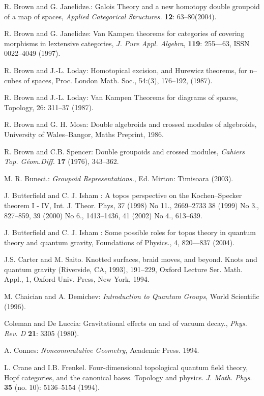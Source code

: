 \documentclass[12pt]{article}
\theoremstyle{plain}
\theoremstyle{definition}
\numberwithin{equation}{section}
\newcommand{\<}{{\langle}}
\begin{document}
\begin{thebibliography}{99}
R. Brown and G. Janelidze.: Galois Theory and a new homotopy double groupoid of a map of spaces, {\em Applied Categorical Structures.} \textbf{12}: 63--80(2004).

R. Brown and G. Janelidze: Van Kampen theorems for categories of covering morphisms in lextensive categories, \textit{J. Pure Appl. Algebra}, \textbf{119}: 255---63, ISSN 0022--4049 (1997).

R. Brown and J.-L. Loday: Homotopical excision, and Hurewicz theorems, for n--cubes of spaces, Proc. London Math. Soc., 54:(3), 176--192, (1987).

R. Brown and J.-L. Loday: Van Kampen Theorems for diagrams of spaces, Topology, 26: 311--37 (1987).

R. Brown and G. H. Mosa: Double algebroids and crossed modules of algebroids, University of Wales--Bangor, Maths Preprint, 1986.

R. Brown  and C.B. Spencer: Double groupoids and crossed modules,
\emph{Cahiers Top. G\'eom.Diff.} \textbf{17} (1976), 343--362.

M. R. Buneci.: \emph{Groupoid Representations.}, Ed. Mirton: Timisoara (2003).

J. Butterfield and C. J. Isham : A topos perspective on the Kochen--Specker theorem I - IV, Int. J. Theor. Phys, 37 (1998) No 11., 2669--2733 38 (1999) No 3., 827--859, 39 (2000) No 6., 1413--1436, 41 (2002) No 4., 613--639.

J. Butterfield and C. J. Isham : Some possible roles for topos theory in quantum theory and quantum gravity, Foundations of Physics., 4, 820---837 (2004).

J.S. Carter and M. Saito. Knotted surfaces, braid moves, and beyond. Knots and
quantum gravity (Riverside, CA, 1993), 191--229, Oxford Lecture Ser. Math. Appl.,
1, Oxford Univ. Press, New York, 1994.

M. Chaician and A. Demichev: \emph{Introduction to Quantum Groups}, World Scientific (1996).

Coleman and De Luccia: Gravitational effects on and of vacuum decay., \emph{Phys. Rev. D} \textbf{21}: 3305 (1980).

A. Connes: \emph{Noncommutative Geometry}, Academic Press. 1994.

L. Crane and I.B. Frenkel. Four-dimensional topological quantum field theory, Hopf categories, and the canonical bases. Topology and physics. \textit{J. Math. Phys}. \textbf{35} (no. 10): 5136--5154 (1994).
 

\end{thebibliography}
\end{document}
